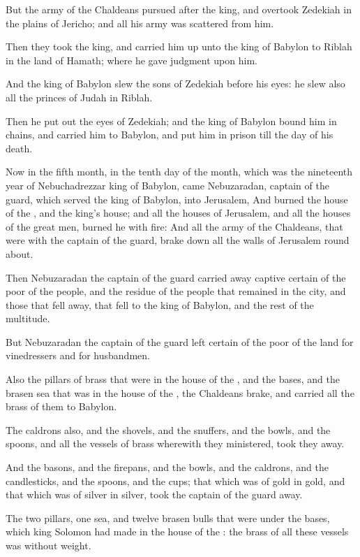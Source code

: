 \Verse But the army of the Chaldeans pursued after the king, and overtook Zedekiah in the plains of Jericho; and all his army was scattered from him.

\Verse Then they took the king, and carried him up unto the king of Babylon to Riblah in the land of Hamath; where he gave judgment upon him.

\Verse And the king of Babylon slew the sons of Zedekiah before his eyes: he slew also all the princes of Judah in Riblah.

\Verse Then he put out the eyes of Zedekiah; and the king of Babylon bound him in chains, and carried him to Babylon, and put him in prison till the day of his death.

\Verse Now in the fifth month, in the tenth day of the month, which was the nineteenth year of Nebuchadrezzar king of Babylon, came Nebuzaradan, captain of the guard, which served the king of Babylon, into Jerusalem, \Verse And burned the house of the \LORD, and the king's house; and all the houses of Jerusalem, and all the houses of the great men, burned he with fire: \Verse And all the army of the Chaldeans, that were with the captain of the guard, brake down all the walls of Jerusalem round about.

\Verse Then Nebuzaradan the captain of the guard carried away captive certain of the poor of the people, and the residue of the people that remained in the city, and those that fell away, that fell to the king of Babylon, and the rest of the multitude.

\Verse But Nebuzaradan the captain of the guard left certain of the poor of the land for vinedressers and for husbandmen.

\Verse Also the pillars of brass that were in the house of the \LORD, and the bases, and the brasen sea that was in the house of the \LORD, the Chaldeans brake, and carried all the brass of them to Babylon.

\Verse The caldrons also, and the shovels, and the snuffers, and the bowls, and the spoons, and all the vessels of brass wherewith they ministered, took they away.

\Verse And the basons, and the firepans, and the bowls, and the caldrons, and the candlesticks, and the spoons, and the cups; that which was of gold in gold, and that which was of silver in silver, took the captain of the guard away.

\Verse The two pillars, one sea, and twelve brasen bulls that were under the bases, which king Solomon had made in the house of the \LORD: the brass of all these vessels was without weight.

